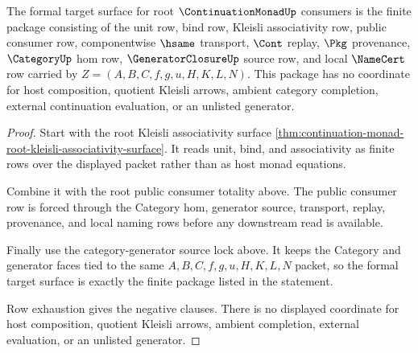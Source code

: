 \begin{theorem}
\label{thm:continuation-monad-root-kleisli-formal-target-package}
The formal target surface for root $\ContinuationMonadUp$ consumers is the finite package consisting of the unit row, bind row, Kleisli associativity row, public consumer row, componentwise $\hsame$ transport, $\Cont$ replay, $\Pkg$ provenance, $\CategoryUp$ hom row, $\GeneratorClosureUp$ source row, and local $\NameCert$ row carried by $Z=(A,B,C,f,g,u,H,K,L,N)$. This package has no coordinate for host composition, quotient Kleisli arrows, ambient category completion, external continuation evaluation, or an unlisted generator.
\end{theorem}
\begin{proof}
Start with the root Kleisli associativity surface \autoref{thm:continuation-monad-root-kleisli-associativity-surface}. It reads unit, bind, and associativity as finite rows over the displayed packet rather than as host monad equations.

Combine it with the root public consumer totality above. The public consumer row is forced through the Category hom, generator source, transport, replay, provenance, and local naming rows before any downstream read is available.

Finally use the category-generator source lock above. It keeps the Category and generator faces tied to the same $A,B,C,f,g,u,H,K,L,N$ packet, so the formal target surface is exactly the finite package listed in the statement.

Row exhaustion gives the negative clauses. There is no displayed coordinate for host composition, quotient Kleisli arrows, ambient completion, external evaluation, or an unlisted generator.
\end{proof}
